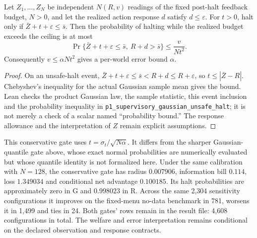\begin{proposition}\label{prop:robust_gate}
Let $Z_1,\ldots,Z_N$ be independent $N(R,v)$ readings of the fixed post-halt feedback budget, $N>0$, and let the realized action response $d$ satisfy $d\le\varepsilon$. For $t>0$, halt only if $\bar Z+t+\varepsilon\le\bar s$. Then the probability of halting while the realized budget exceeds the ceiling is at most
\[
 \Pr\{\bar Z+t+\varepsilon\le\bar s,\ R+d>\bar s\}
 \le \frac{v}{Nt^2}.
\]
Consequently $v\le\alpha Nt^2$ gives a per-world error bound $\alpha$.
\end{proposition}
\begin{proof}
On an unsafe-halt event, $\bar Z+t+\varepsilon\le\bar s<R+d\le R+\varepsilon$, so $t\le|\bar Z-R|$. Chebyshev's inequality for the actual Gaussian sample mean gives the bound. Lean checks the product Gaussian law, the sample statistic, this event inclusion and the probability inequality in \nolinkurl{p1_supervisory_gaussian_unsafe_halt}; it is not merely a check of a scalar named ``probability bound.'' The response allowance and the interpretation of $Z$ remain explicit assumptions.
\end{proof}

This conservative gate uses $t=\sigma_t/\sqrt{N\alpha}$. It differs from the sharper Gaussian-quantile gate above, whose exact normal probabilities are numerically evaluated but whose quantile identity is not formalized here. Under the same calibration with $N=128$, the conservative gate has radius $0.007906$, information bill $0.114$, loss $1.349034$ and conditional net advantage $0.100185$. Its halt probabilities are approximately zero in G and $0.998023$ in R. Across the same 2,304 sensitivity configurations it improves on the fixed-menu no-data benchmark in 781, worsens it in 1,499 and ties in 24. Both gates' rows remain in the result file: 4,608 configurations in total. The welfare and error interpretation remains conditional on the declared observation and response contracts.

